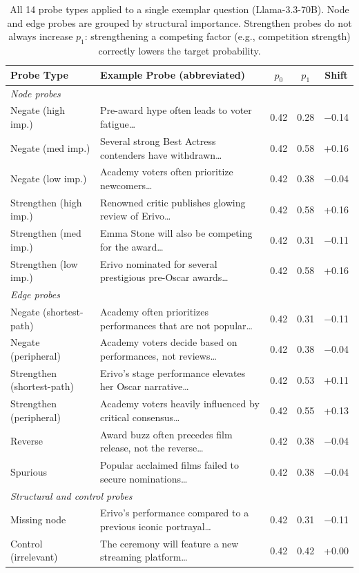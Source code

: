 \documentclass[11pt]{article}
\begin{document}
\begin{table}[t]
\centering
\small
\begin{tabular}{llccc}
\toprule
\textbf{Probe Type} & \textbf{Example Probe (abbreviated)} & \textbf{$p_0$} & \textbf{$p_1$} & \textbf{Shift} \\
\midrule
\multicolumn{5}{l}{\textit{Node probes}} \\
Negate (high imp.) & Pre-award hype often leads to voter fatigue\ldots & 0.42 & 0.28 & $-$0.14 \\
Negate (med imp.) & Several strong Best Actress contenders have withdrawn\ldots & 0.42 & 0.58 & +0.16 \\
Negate (low imp.) & Academy voters often prioritize newcomers\ldots & 0.42 & 0.38 & $-$0.04 \\
Strengthen (high imp.) & Renowned critic publishes glowing review of Erivo\ldots & 0.42 & 0.58 & +0.16 \\
Strengthen (med imp.) & Emma Stone will also be competing for the award\ldots & 0.42 & 0.31 & $-$0.11 \\
Strengthen (low imp.) & Erivo nominated for several prestigious pre-Oscar awards\ldots & 0.42 & 0.58 & +0.16 \\
\midrule
\multicolumn{5}{l}{\textit{Edge probes}} \\
Negate (shortest-path) & Academy often prioritizes performances that are not popular\ldots & 0.42 & 0.31 & $-$0.11 \\
Negate (peripheral) & Academy voters decide based on performances, not reviews\ldots & 0.42 & 0.38 & $-$0.04 \\
Strengthen (shortest-path) & Erivo's stage performance elevates her Oscar narrative\ldots & 0.42 & 0.53 & +0.11 \\
Strengthen (peripheral) & Academy voters heavily influenced by critical consensus\ldots & 0.42 & 0.55 & +0.13 \\
Reverse & Award buzz often precedes film release, not the reverse\ldots & 0.42 & 0.38 & $-$0.04 \\
Spurious & Popular acclaimed films failed to secure nominations\ldots & 0.42 & 0.38 & $-$0.04 \\
\midrule
\multicolumn{5}{l}{\textit{Structural and control probes}} \\
Missing node & Erivo's performance compared to a previous iconic portrayal\ldots & 0.42 & 0.31 & $-$0.11 \\
Control (irrelevant) & The ceremony will feature a new streaming platform\ldots & 0.42 & 0.42 & +0.00 \\
\bottomrule
\end{tabular}
\caption{All 14 probe types applied to a single exemplar question (Llama-3.3-70B). Node and edge probes are grouped by structural importance. Strengthen probes do not always increase $p_1$: strengthening a competing factor (e.g., competition strength) correctly lowers the target probability.}
\label{tab:probe_examples}
\end{table}
\end{document}
